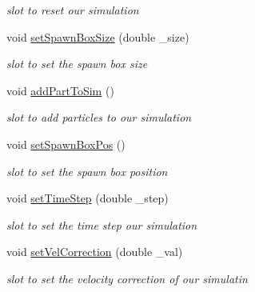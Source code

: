 \begin{DoxyCompactItemize}
\begin{DoxyCompactList}\small\item\em slot to reset our simulation \end{DoxyCompactList}\item 
void \hyperlink{class_fluid_prop_dock_widget_ae59c72dfb12faf77940e805e94b78cbf}{set\-Spawn\-Box\-Size} (double \-\_\-size)
\begin{DoxyCompactList}\small\item\em slot to set the spawn box size \end{DoxyCompactList}\item 
\hypertarget{class_fluid_prop_dock_widget_a1e3b987049f5f5ff5958a7cd3dcdbdff}{void \hyperlink{class_fluid_prop_dock_widget_a1e3b987049f5f5ff5958a7cd3dcdbdff}{add\-Part\-To\-Sim} ()}\label{class_fluid_prop_dock_widget_a1e3b987049f5f5ff5958a7cd3dcdbdff}

\begin{DoxyCompactList}\small\item\em slot to add particles to our simulation \end{DoxyCompactList}\item 
\hypertarget{class_fluid_prop_dock_widget_aac86685277d0b7f6c631e5f53efdc247}{void \hyperlink{class_fluid_prop_dock_widget_aac86685277d0b7f6c631e5f53efdc247}{set\-Spawn\-Box\-Pos} ()}\label{class_fluid_prop_dock_widget_aac86685277d0b7f6c631e5f53efdc247}

\begin{DoxyCompactList}\small\item\em slot to set the spawn box position \end{DoxyCompactList}\item 
void \hyperlink{class_fluid_prop_dock_widget_a03628de74620c25af71461a255163a84}{set\-Time\-Step} (double \-\_\-step)
\begin{DoxyCompactList}\small\item\em slot to set the time step our simulation \end{DoxyCompactList}\item 
void \hyperlink{class_fluid_prop_dock_widget_a7c06460036dcca6716dea7b7fc70ad66}{set\-Vel\-Correction} (double \-\_\-val)
\begin{DoxyCompactList}\small\item\em slot to set the velocity correction of our simulatin \end{DoxyCompactList}\end{DoxyCompactItemize}
